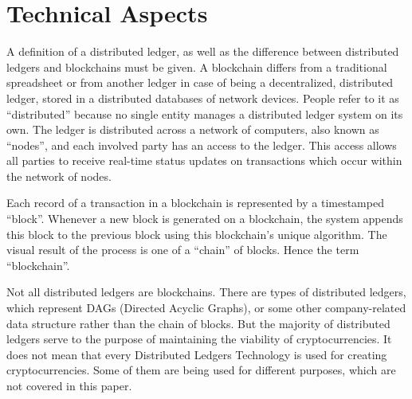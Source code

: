 \documentclass[12pt]{article}
\begin{document}
\section{Technical Aspects}\label{sec:ta}
A definition of a distributed ledger, as well as
the difference between distributed ledgers and blockchains must be given. A
blockchain differs from a traditional spreadsheet or from another ledger in case of being a decentralized, distributed ledger, stored in a distributed databases of
network devices. People refer to it as ``distributed'' because no single entity
manages a distributed ledger system on its own. The
ledger is distributed across a network of computers, also known as ``nodes'', and
each involved party has an access to the ledger. This access allows all parties to
receive real-time status updates on transactions which occur within the network
of nodes.

Each record of a transaction in a blockchain is represented by a timestamped
``block''. Whenever a new block is generated on a blockchain, the system
appends this block to the previous block using this blockchain’s unique
algorithm. The visual result of the process is one of a ``chain'' of blocks.
Hence the term ``blockchain''.

Not all distributed ledgers are blockchains. There are types of distributed
ledgers, which represent DAGs (Directed Acyclic Graphs), or some other
company-related data structure rather than the chain of blocks. But the
majority of distributed ledgers serve to the purpose of maintaining the
viability of cryptocurrencies. It does not mean that every Distributed Ledgers
Technology is used for creating cryptocurrencies. Some of them are being used for
different purposes, which are not covered in this paper.
\end{document}
